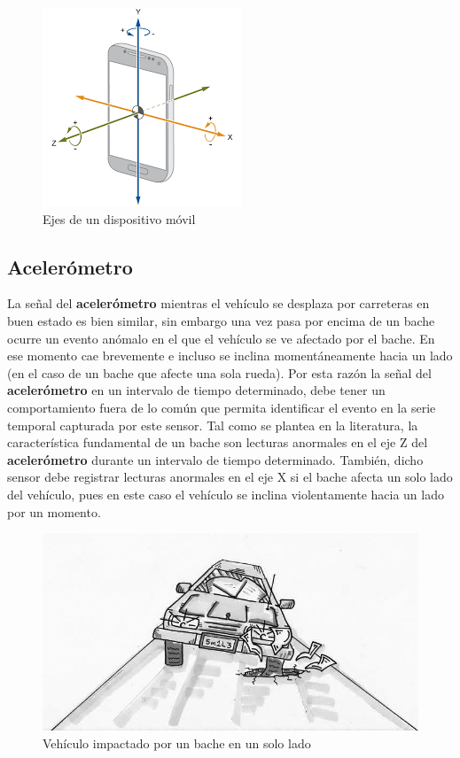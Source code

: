 	\begin{figure}[htb]
		\centering
		\includegraphics[scale = 0.5]{Graphics/mobile_phone_axis.png}
		\caption{Ejes de un dispositivo móvil}
		\label{fig:4}
	\end{figure}

	\subsection{Acelerómetro}
		La señal del \textbf{acelerómetro} mientras el vehículo se desplaza por carreteras en buen estado es bien similar,
		sin embargo una vez pasa por encima de un bache ocurre un evento anómalo en el que el vehículo se ve afectado
		por el bache. En ese momento cae brevemente e incluso se inclina momentáneamente hacia un lado (en el caso de un bache
		que afecte una sola rueda). Por esta razón la señal del \textbf{acelerómetro} en un intervalo de tiempo determinado, debe tener
		un comportamiento fuera de lo común que permita identificar el evento en la serie temporal capturada por este sensor.
		Tal como se plantea en la literatura, la característica fundamental de un bache son lecturas anormales en el eje
		Z del \textbf{acelerómetro} durante un intervalo de tiempo determinado. También, dicho sensor debe registrar lecturas
		anormales en el eje X si el bache afecta un solo lado del vehículo, pues en este caso el vehículo se inclina violentamente
		hacia un lado por un momento.\\

	\begin{figure}[htb]
		\centering
		\includegraphics[scale = 0.5]{Graphics/one_side_pothole_vehicle.jpg}
		\caption{Vehículo impactado por un bache en un solo lado}
		\label{fig:5}
	\end{figure}

